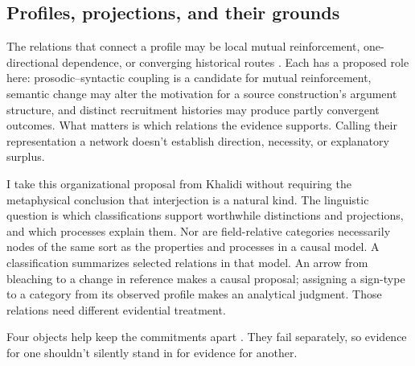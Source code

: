 \documentclass[12pt]{article}
\begin{document}
\subsection{Profiles, projections, and their grounds}

The relations that connect a profile may be local mutual reinforcement, one-directional dependence, or converging historical routes \citep{khalidi2013,khalidi2018nodes}. Each has a proposed role here: prosodic--syntactic coupling is a candidate for mutual reinforcement, semantic change may alter the motivation for a source construction's argument structure, and distinct recruitment histories may produce partly convergent outcomes. What matters is which relations the evidence supports. Calling their representation a network doesn't establish direction, necessity, or explanatory surplus.

I take this organizational proposal from Khalidi without requiring the metaphysical conclusion that interjection is a natural kind. The linguistic question is which classifications support worthwhile distinctions and projections, and which processes explain them. Nor are field-relative categories necessarily nodes of the same sort as the properties and processes in a causal model. A classification summarizes selected relations in that model. An arrow from bleaching to a change in reference makes a causal proposal; assigning a sign-type to a category from its observed profile makes an analytical judgment. Those relations need different evidential treatment.

Four objects help keep the commitments apart \citep[adapted from][11--12]{reynolds2026projectibilityHistory}. They fail separately, so evidence for one shouldn't silently stand in for evidence for another.
\end{document}
